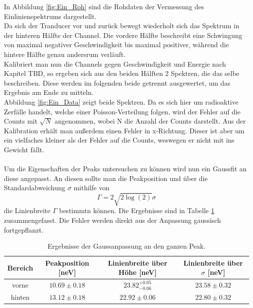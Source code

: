 \documentclass[12pt,a4paper]{article}
\begin{document}
In Abbildung \ref{fig:Ein_Roh} sind die Rohdaten der Vermessung des Einlinienspektrums dargestellt.\\
Da sich der Tranducer vor und zurück bewegt wiederholt sich das Spektrum in der hinteren Hälfte der Channel. Die vordere Hälfte beschreibt eine Schwingung von maximal negativer Geschwindigkeit bis maximal positiver, während die hintere Hälfte genau andersrum verläuft.\\
Kalibriert man nun die Channels gegen Geschwindigkeit und Energie nach Kapitel TBD, so ergeben sich aus den beiden Hälften 2 Spektren, die das selbe beschreiben. Diese werden im folgenden beide getrennt ausgewertet, um das Ergebnis am Ende zu mitteln.\\
Abbildung \ref{fig:Ein_Data} zeigt beide Spektren. Da es sich hier um radioaktive Zerfälle handelt, welche einer Poisson-Verteilung folgen, wird der Fehler auf die Counts mit $\sqrt{N}$ angenommen, wobei N die Anzahl der Counts darstellt. Aus der Kalibration erhält man außerdem einen Fehler in x-Richtung. Dieser ist aber um ein vielfaches kleiner als der Fehler auf die Counts, weswegen er nicht mit ins Gewicht fällt.\\
\\
Um die Eigenschaften der Peaks untersuchen zu können wird nun ein Gaussfit an diese angepasst. An diesen sollte man die Peakposition und über die Standardabweichung $\sigma$ mithilfe von 
\begin{equation}
\Gamma = 2\sqrt{2\log(2)}\sigma
\end{equation}
die Linienbreite $\Gamma$  bestimmtn können. Die Ergebnisse sind in Tabelle \ref{tab:Ein_gauss} zusammengefasst. Die Fehler werden direkt aus der Anpassung gaussisch fortgepflanzt.\\

\begin{table}
\centering
\begin{tabular}{|c|c|c|c|}
\hline 
Bereich & Peakposition [neV] & Linienbreite über Höhe [neV] & Linienbreite über $\sigma$ [neV]\\ 
\hline 
vorne & $10.69\pm 0.18$ & $23.82^{+0.05}_{-0.06}$ & $23.58\pm 0.32$ \\ 
\hline 
hinten & $13.12\pm 0.18$ & $22.92\pm 0.06$ & $22.80\pm 0.32$ \\ 
\hline 
\end{tabular}
\caption{Ergebnisse der Gaussanpassung an den ganzen Peak.}
\label{tab:Ein_gauss}
\end{table}
\end{document}
